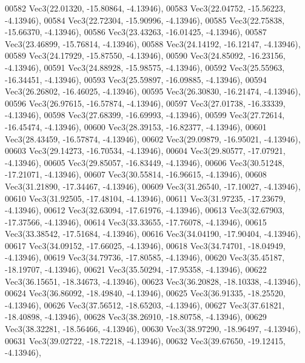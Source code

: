 \begin{DoxyCode}
00582         Vec3(22.01320, -15.80864, -4.13946),
00583         Vec3(22.04752, -15.56223, -4.13946),
00584         Vec3(22.72304, -15.90996, -4.13946),
00585         Vec3(22.75838, -15.66370, -4.13946),
00586         Vec3(23.43263, -16.01425, -4.13946),
00587         Vec3(23.46899, -15.76814, -4.13946),
00588         Vec3(24.14192, -16.12147, -4.13946),
00589         Vec3(24.17929, -15.87550, -4.13946),
00590         Vec3(24.85092, -16.23156, -4.13946),
00591         Vec3(24.88928, -15.98575, -4.13946),
00592         Vec3(25.55963, -16.34451, -4.13946),
00593         Vec3(25.59897, -16.09885, -4.13946),
00594         Vec3(26.26802, -16.46025, -4.13946),
00595         Vec3(26.30830, -16.21474, -4.13946),
00596         Vec3(26.97615, -16.57874, -4.13946),
00597         Vec3(27.01738, -16.33339, -4.13946),
00598         Vec3(27.68399, -16.69993, -4.13946),
00599         Vec3(27.72614, -16.45474, -4.13946),
00600         Vec3(28.39153, -16.82377, -4.13946),
00601         Vec3(28.43459, -16.57874, -4.13946),
00602         Vec3(29.09879, -16.95021, -4.13946),
00603         Vec3(29.14273, -16.70534, -4.13946),
00604         Vec3(29.80577, -17.07921, -4.13946),
00605         Vec3(29.85057, -16.83449, -4.13946),
00606         Vec3(30.51248, -17.21071, -4.13946),
00607         Vec3(30.55814, -16.96615, -4.13946),
00608         Vec3(31.21890, -17.34467, -4.13946),
00609         Vec3(31.26540, -17.10027, -4.13946),
00610         Vec3(31.92505, -17.48104, -4.13946),
00611         Vec3(31.97235, -17.23679, -4.13946),
00612         Vec3(32.63094, -17.61976, -4.13946),
00613         Vec3(32.67903, -17.37566, -4.13946),
00614         Vec3(33.33655, -17.76078, -4.13946),
00615         Vec3(33.38542, -17.51684, -4.13946),
00616         Vec3(34.04190, -17.90404, -4.13946),
00617         Vec3(34.09152, -17.66025, -4.13946),
00618         Vec3(34.74701, -18.04949, -4.13946),
00619         Vec3(34.79736, -17.80585, -4.13946),
00620         Vec3(35.45187, -18.19707, -4.13946),
00621         Vec3(35.50294, -17.95358, -4.13946),
00622         Vec3(36.15651, -18.34673, -4.13946),
00623         Vec3(36.20828, -18.10338, -4.13946),
00624         Vec3(36.86092, -18.49840, -4.13946),
00625         Vec3(36.91335, -18.25520, -4.13946),
00626         Vec3(37.56512, -18.65203, -4.13946),
00627         Vec3(37.61821, -18.40898, -4.13946),
00628         Vec3(38.26910, -18.80758, -4.13946),
00629         Vec3(38.32281, -18.56466, -4.13946),
00630         Vec3(38.97290, -18.96497, -4.13946),
00631         Vec3(39.02722, -18.72218, -4.13946),
00632         Vec3(39.67650, -19.12415, -4.13946),

\end{DoxyCode}
